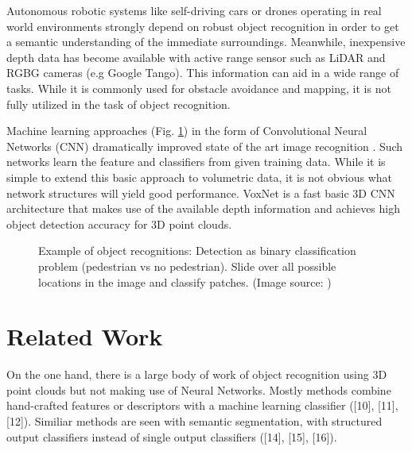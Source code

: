 \documentclass[10pt,twocolumn,letterpaper]{article}
\begin{document}
Autonomous robotic systems like self-driving cars or drones operating in real world environments strongly depend on robust object recognition
in order to get a semantic understanding of the immediate surroundings.
Meanwhile, inexpensive depth data has become available with active range sensor such as LiDAR and RGBG cameras (e.g Google Tango). 
This information can aid in a wide range of tasks. While it is commonly used for obstacle avoidance and mapping, it is not fully 
utilized in the task of object recognition.


Machine learning approaches (Fig. \ref{fig:obj_rec}) in the form of Convolutional Neural Networks (CNN) dramatically improved state 
of the art image recognition \cite{krizhevsky2012imagenet}. Such networks learn the feature and classifiers from given training data.
While it is simple to extend this basic approach to volumetric data, it is not obvious what network structures will yield good performance.
VoxNet \cite{voxnet} is a fast basic 3D CNN architecture that makes use of the available depth information and achieves high object detection accuracy for 
3D point clouds.



\begin{figure}[h]
	\label{fig:obj_rec}
	\centering
	\caption{Example of object recognitions: Detection as binary classification problem (pedestrian vs no pedestrian). Slide over all possible locations in the image and classify patches. 
	  (Image source: \cite{udacity})}
\end{figure}


\section{Related Work}

On the one hand, there is a large body of work of object recognition using 3D point clouds but not making use of Neural Networks. 
Mostly methods combine hand-crafted features or descriptors with a machine learning classifier ([10], [11], [12]). 
Similiar methods are seen with semantic segmentation, with structured output classifiers instead of single output classifiers ([14], [15], [16]).
\end{document}
